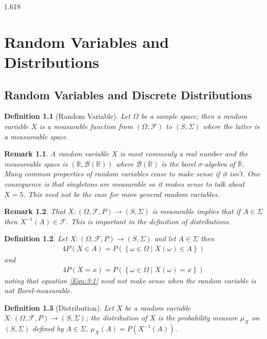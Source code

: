 \documentclass[11pt, oneside]{book}   	%
\newtheorem{definition}{Definition}[chapter]
\newtheorem{remark}{Remark}[chapter]
\newcommand{\set}[1]{\left\{#1\right\}}
\begin{document}
\begin{spacing}{1.618}
\chapter{Random Variables and Distributions}
	\section{Random Variables and Discrete Distributions}
		\begin{definition}[Random Variable]
			Let $\Omega$ be a sample space; then a \emph{random variable} $X$ is a measurable function from $(\Omega, \mathcal{F})$ to $(S, \Sigma)$ where the latter is a measureable space. 
		\end{definition}
		
		\begin{remark}
			A random variable $X$ is most commonly a real number and the measureable space is $(\mathbb{R}, \mathcal{B}(\mathbb{R}))$ where $\mathcal{B}(\mathbb{R})$ is the borel $\sigma$-algebra of $\mathbb{R}$. Many common properties of random variables cease to make sense if it isn't. One consequence is that singletons are measurable so it makes sense to talk about $X=5$. This need not be the case for more general random variables. 
		\end{remark}
		
		\begin{remark}
			That $X : (\Omega, \mathcal{F}, P) \to (S, \Sigma)$ is measurable implies that if $A\in\Sigma$ then $X^{-1}(A)\in\mathcal{F}$. This is important in the definition of distributions. 
		\end{remark}

		\begin{definition}
			Let $X : (\Omega, \mathcal{F}, P) \to (S, \Sigma)$ and let $A\in\Sigma$ then 
			\begin{alignat}{4}
				P(X\in A)=P(\set{\omega\in\Omega\mid X(\omega)\in A})
			\end{alignat}
			and 
			\begin{alignat}{4}
				P(X=x)=P(\set{\omega\in\Omega\mid X(\omega) = x}) \label{Eqn:3:1}
			\end{alignat}
			noting that equation \ref{Eqn:3:1} need not make sense when the random variable is not Borel-measurable. 
		\end{definition}
		
		\begin{definition}[Distribution]
			Let $X$ be a random variable $X:(\Omega, \mathcal{F}, P)\to (S, \Sigma)$; the \emph{distribution} of $X$ is the probability measure $\mu_X$ on $(S, \Sigma)$ defined by $A\in\Sigma$, $\mu_X(A)=P(X^{-1}(A))$.  
		\end{definition}
		

\end{spacing}
\end{document}
